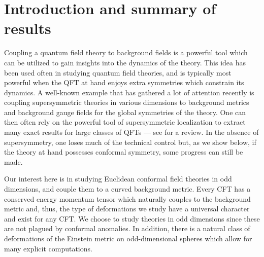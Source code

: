 \documentclass[12pt]{article}
\numberwithin{equation}{section}
\begin{document}
\setcounter{tocdepth}{2}
{\small
\setlength\parskip{-0.5mm} 
\tableofcontents
}

\section{Introduction and summary of results} 
\label{sec:intro} 

Coupling a quantum field theory to background fields is a powerful tool which can be utilized to gain insights into the dynamics of the theory. This idea has been used often in studying quantum field theories, and is typically most powerful when the QFT at hand enjoys extra symmetries which constrain its dynamics. A well-known example that has gathered a lot of attention recently is coupling supersymmetric theories in various dimensions to background metrics and background gauge fields for the global symmetries of the theory. One can then often rely on the powerful tool of supersymmetric localization to extract many exact results for large classes of QFTs --- see \cite{Pestun:2016zxk} for a review. In the absence of supersymmetry, one loses much of the technical control but, as we show below, if the theory at hand possesses conformal symmetry, some progress can still be made.

Our interest here is in studying Euclidean conformal field theories in odd dimensions, and couple them to a curved background metric. Every CFT has a conserved energy momentum tensor which naturally couples to the background metric and, thus, the type of deformations we study have a universal character and exist for any CFT. We choose to study theories in odd dimensions since these are not plagued by conformal anomalies. In addition, there is a natural class of deformations of the Einstein metric on odd-dimensional spheres which allow for many explicit computations. 
\end{document}

